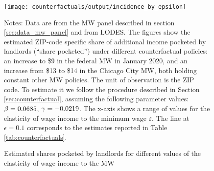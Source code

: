 \begin{figure}[hbt!]
    \centering
    \caption{Estimated shares pocketed by landlords for different values of 
             the elasticity of wage income to the MW}
    \label{fig:cf_share_by_epsilon}

    \texttt{[image: counterfactuals/output/incidence\_by\_epsilon]}

    \begin{minipage}{.95\textwidth} \footnotesize
        \vspace{3mm}
        Notes:
        Data are from the MW panel described in section \ref{sec:data_mw_panel} 
        and from LODES.
        The figures show the estimated ZIP-code specific share of additional 
        income pocketed by landlords (``share pocketed'')
        under different counterfactual policies:
        an increase to \$9 in the federal MW in January 2020, and
        an increase from \$13 to \$14 in the Chicago City MW, 
        both holding constant other MW policies.
        The unit of observation is the ZIP code.
        To estimate it we follow the procedure described in Section 
        \ref{sec:counterfactual}, assuming the following parameter values: 
        $\beta = 0.0685$, $\gamma = -0.0219$. 
        The x-axis shows a range of values for the elasticity of wage 
        income to the minimum wage $\varepsilon$.
        The line at $\epsilon=0.1$ corresponds to the estimates reported in
        Table \ref{tab:counterfactuals}.
    \end{minipage}
\end{figure}
